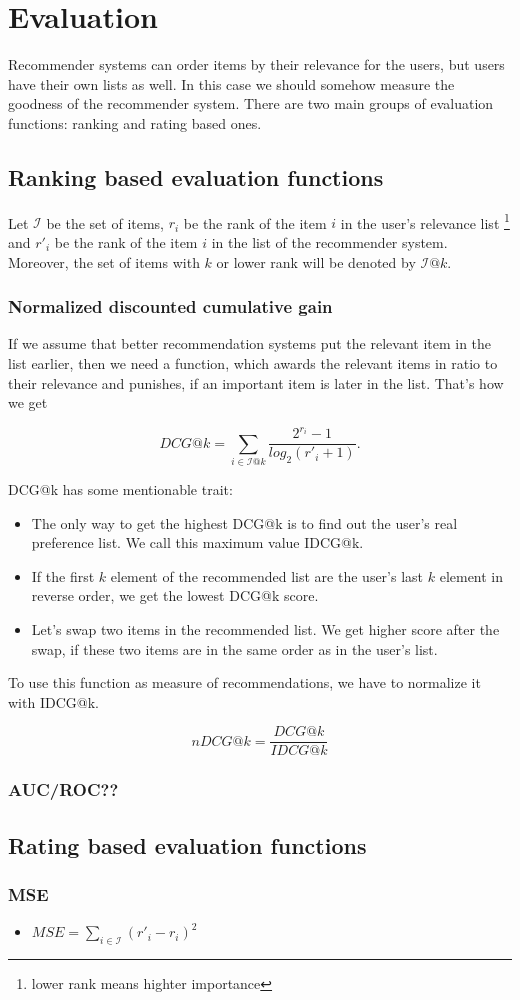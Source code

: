 \section{Evaluation}
Recommender systems can order items by their relevance for the users, but
users have their own lists as well. In this case we should somehow measure
the goodness of the recommender system. There are two main groups of evaluation
functions: ranking and rating based ones.

\subsection{Ranking based evaluation functions}
Let $\mathcal{I}$ be the set of items, $r_i$ be the rank of the item $i$ in the
user's relevance list \footnote{lower rank means highter importance}  and
$r'_i$ be the rank of the item $i$ in the list of the recommender system.
Moreover, the set of items with $k$ or lower rank will be denoted by $\mathcal{I}@k$.

\subsubsection{Normalized discounted cumulative gain}
If we assume that better recommendation systems put the relevant item
in the list earlier, then we need a function, which awards the relevant items
in ratio to their relevance and punishes, if an important item is later in the
list. That's how we get

$$ DCG@k=\sum_{i \in \mathcal{I}@k}\frac{2^{r_i}-1}{log_2(r'_i+1)}.$$

DCG@k has some mentionable trait:
\begin{itemize}
\item The only way to get the highest DCG@k is to find out the user's real preference
  list. We call this maximum value IDCG@k.
\item If the first $k$ element of the recommended list are the user's last $k$ element in
  reverse order, we get the lowest DCG@k score.
\item Let's swap two items in the recommended list. We get higher score after the
  swap, if these two items are in the same order as in the user's list.
\end{itemize}
To use this function as measure of recommendations, we have to normalize it with
IDCG@k.

$$nDCG@k=\frac{DCG@k}{IDCG@k}$$

\subsubsection{AUC/ROC??}

\subsection{Rating based evaluation functions}
\subsubsection{MSE}

\begin{itemize}
\item $MSE=\sum_{i\in\mathcal{I}} (r'_i - r_i)^2$ 

  
\end{itemize}
